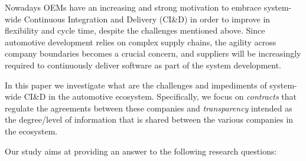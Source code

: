 Nowadays OEMs have an increasing and strong motivation
to embrace system-wide Continuous Integration and Delivery (CI\&D) in order to improve
in flexibility and cycle time, despite the challenges mentioned above. 
Since automotive development relies on complex supply chains, the agility across company boundaries becomes a crucial concern, and suppliers will be increasingly required to continuously deliver software as part of the system development.

In this paper we investigate %
what are the challenges and impediments of system-wide CI\&D in the automotive ecosystem. 
Specifically, we focus on {\em contracts} that regulate the agreements between these companies 
and {\em transparency} intended as the degree/level of information that is shared between the various companies in the ecosystem. 

Our study aims at providing an answer to the following research questions:

%

